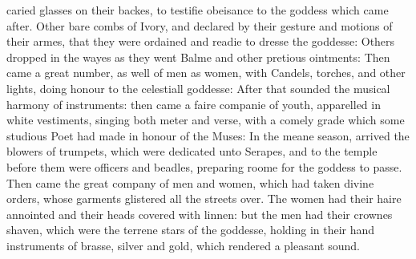 caried glasses on their backes, to testifie obeisance to the goddess which came
after. Other bare combs of Ivory, and declared by their gesture and motions of
their armes, that they were ordained and readie to dresse the goddesse: Others
dropped in the wayes as they went Balme and other pretious ointments: Then came
a great number, as well of men as women, with Candels, torches, and other
lights, doing honour to the celestiall goddesse: After that sounded the musical
harmony of instruments: then came a faire companie of youth, apparelled in
white vestiments, singing both meter and verse, with a comely grade which some
studious Poet had made in honour of the Muses: In the meane season, arrived the
blowers of trumpets, which were dedicated unto Serapes, and to the temple
before them were officers and beadles, preparing roome for the goddess to
passe. Then came the great company of men and women, which had taken divine
orders, whose garments glistered all the streets over. The women had their
haire annointed and their heads covered with linnen: but the men had their
crownes shaven, which were the terrene stars of the goddesse, holding in their
hand instruments of brasse, silver and gold, which rendered a pleasant sound.

